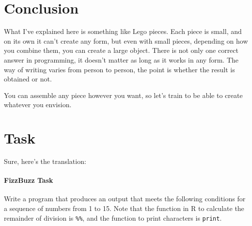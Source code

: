 \documentclass{ltjsbook}
\begin{document}
\section{Conclusion}
What I've explained here is something like Lego pieces. Each piece is small, and on its own it can't create any form, but even with small pieces, depending on how you combine them, you can create a large object.
There is not only one correct answer in programming, it doesn't matter as long as it works in any form. The way of writing varies from person to person, the point is whether the result is obtained or not.

You can assemble any piece however you want, so let's train to be able to create whatever you envision.

\section{Task}
Sure, here's the translation:

\paragraph{FizzBuzz Task}
Write a program that produces an output that meets the following conditions for a sequence of numbers from 1 to 15. Note that the function in R to calculate the remainder of division is \verb|%%|, and the function to print characters is \verb|print|.

\end{document}
